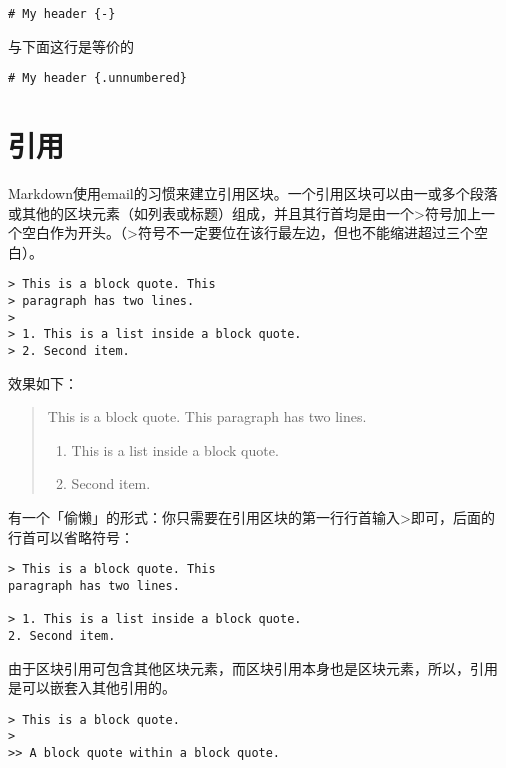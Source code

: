 \documentclass[fancyhdr,bookmark]{ctexbook}
\providecommand{\tightlist}{%
  \setlength{\itemsep}{0pt}\setlength{\parskip}{0pt}}
\begin{document}
\begin{lstlisting}
# My header {-}
\end{lstlisting}

与下面这行是等价的

\begin{lstlisting}
# My header {.unnumbered}
\end{lstlisting}

\hypertarget{ux5f15ux7528}{%
\section{引用}\label{ux5f15ux7528}}

Markdown使用email的习惯来建立引用区块。一个引用区块可以由一或多个段落
或其他的区块元素（如列表或标题）组成，并且其行首均是由一个\textgreater 符号加上一
个空白作为开头。（\textgreater 符号不一定要位在该行最左边，但也不能缩进超过三个空白）。

\begin{lstlisting}
> This is a block quote. This
> paragraph has two lines.
>
> 1. This is a list inside a block quote.
> 2. Second item.
\end{lstlisting}

效果如下：

\begin{quote}
This is a block quote. This paragraph has two lines.

\begin{enumerate}
\def\labelenumi{\arabic{enumi}.}
\tightlist
\item
  This is a list inside a block quote.
\item
  Second item.
\end{enumerate}
\end{quote}

有一个「偷懒」的形式：你只需要在引用区块的第一行行首输入\textgreater 即可，后面的
行首可以省略符号：

\begin{lstlisting}
> This is a block quote. This
paragraph has two lines.

> 1. This is a list inside a block quote.
2. Second item.
\end{lstlisting}

由于区块引用可包含其他区块元素，而区块引用本身也是区块元素，所以，引用
是可以嵌套入其他引用的。

\begin{lstlisting}
> This is a block quote.
>
>> A block quote within a block quote.
\end{lstlisting}
\end{document}
